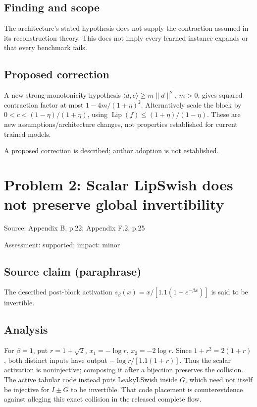 \documentclass[11pt]{article}
\begin{document}
\subsection*{Finding and scope}

The architecture’s stated hypothesis does not supply the contraction assumed in its reconstruction theory. This does not imply every learned instance expands or that every benchmark fails.

\subsection*{Proposed correction}

A new strong-monotonicity hypothesis \(\langle d,e\rangle\ge m\|d\|^2\), \(m>0\), gives squared contraction factor at most \(1-4m/(1+\eta)^2\). Alternatively scale the block by \(0<c<(1-\eta)/(1+\eta)\), using \(\operatorname{Lip}(f)\le(1+\eta)/(1-\eta)\). These are new assumptions/architecture changes, not properties established for current trained models.

A proposed correction is described; author adoption is not established.

\section*{Problem 2: Scalar LipSwish does not preserve global invertibility}

Source: Appendix B, p.22; Appendix F.2, p.25

Assessment: supported; impact: minor

\subsection*{Source claim (paraphrase)}

The described post-block activation \(s_\beta(x)=x/[1.1(1+e^{-\beta x})]\) is said to be invertible.

\subsection*{Analysis}

For \(\beta=1\), put \(r=1+\sqrt2\), \(x_1=-\log r\), \(x_2=-2\log r\). Since \(1+r^2=2(1+r)\), both distinct inputs have output \(-\log r/[1.1(1+r)]\). Thus the scalar activation is noninjective; composing it after a bijection preserves the collision. The active tabular code instead puts LeakyLSwish inside \(G\), which need not itself be injective for \(I\pm G\) to be invertible. That code placement is counterevidence against alleging this exact collision in the released complete flow.
\end{document}
